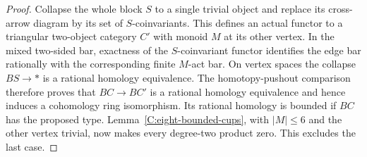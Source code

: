 \begin{proof}
Collapse the whole block $S$ to a single trivial object and
replace its cross-arrow diagram by its set of $S$-coinvariants.
This defines an actual functor to a triangular two-object
category $C'$ with monoid $M$ at its other vertex. In the
mixed two-sided bar, exactness of the $S$-coinvariant functor
identifies the edge bar rationally with the corresponding
finite $M$-act bar. On vertex spaces the collapse $BS\to *$
is a rational homology equivalence. The homotopy-pushout
comparison therefore proves that $BC\to BC'$ is a rational
homology equivalence and hence induces a cohomology ring
isomorphism. Its rational homology is bounded if $BC$ has
the proposed type. Lemma~\ref{C:eight-bounded-cups}, with
$|M|\leq6$ and the other vertex trivial, now makes every
degree-two product zero. This excludes the last case.
\end{proof}

